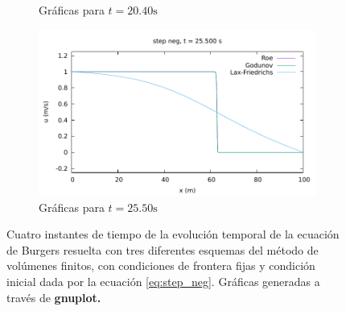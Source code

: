 \documentclass[12pt]{article}
\begin{document}
\begin{figure}[h]
\begin{subfigure}[b]{0.49\textwidth}
 		\caption*{Gráficas para $t=20.40\unit{\second}$}
 		\label{fig:step_neg-fija3}
 	\end{subfigure}
 	\vfill
 	\begin{subfigure}[b]{0.49\textwidth}
 		\includegraphics[width=\textwidth]{../burgers1DVF/results/sol_fijas/step_neg/850.pdf}
 		\caption*{Gráficas para $t=25.50\unit{\second}$}
 		\label{fig:step_neg-fija4}
 	\end{subfigure}
 	\caption{Cuatro instantes de tiempo de la evolución temporal de la ecuación de Burgers resuelta con tres diferentes esquemas del método de volúmenes finitos, con condiciones de frontera fijas y condición inicial dada por la ecuación \ref{eq:step_neg}. Gráficas generadas a través de \textbf{gnuplot.}}
 	\label{fig:instantes-step_neg-fija}
 \end{figure}
 
\end{document}
